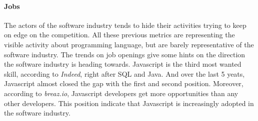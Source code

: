 


\paragraph{Jobs}

The actors of the software industry tends to hide their activities trying to keep on edge on the competition.
All these previous metrics are representing the visible activity about programming language, but are barely representative of the software industry.
The trends on job openings give some hints on the direction the software industry is heading towards.
Javascript is the third most wanted skill, according to \textit{Indeed}, right after SQL and Java.
And over the last 5 yeats, Javascript almost closed the gap with the first and second position.
Moreover, according to \textit{breaz.io}, Javascript developers get more opportunities than any other developers.
This position indicate that Javascript is increasingly adopted in the software industry.

